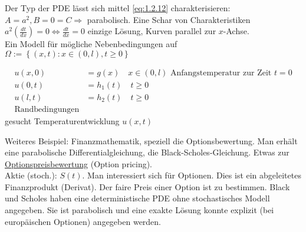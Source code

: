 Der Typ der PDE lässt sich mittel \eqref{eq:1.2.12} charakterisieren: $A=a^2, B=0=C \Rightarrow$ parabolisch. Eine Schar von Charakteristiken $a^2(\frac{dt}{dx})=0 \Leftrightarrow \frac{dt}{dx} = 0$ einzige Lösung, Kurven parallel zur $x$-Achse.\\

Ein Modell für mögliche Nebenbedingungen auf $\Omega:= \left\{ (x,t): x\in (0,l), t\geq 0 \right\}$

\begin{equation}
    \begin{aligned}
        u(x,0) &= g(x) \quad x\in (0,l) \text{ Anfangstemperatur zur Zeit } t=0\\
            u(0,t) &= h_1(t) \quad t\geq 0\\
            u(l,t) &= h_2(t) \quad t\geq 0\\
    \text{Randbedingungen}
\end{aligned}
    \label{}
\end{equation}
gesucht Temperaturentwicklung $u(x,t)$

Weiteres Beispiel: Finanzmathematik, speziell die Optionsbewertung. Man erhält eine parabolische Differentialgleichung, die Black-Scholes-Gleichung. Etwas zur \underline{Optionspreisbewertung} (Option pricing).\\
Aktie (stoch.): $S(t)$. Man interessiert sich für Optionen. Dies ist ein abgeleitetes Finanzprodukt (Derivat). Der faire Preis einer Option ist zu bestimmen. Black und Scholes haben eine deterministische PDE ohne stochastisches Modell angegeben. Sie ist parabolisch und eine exakte Lösung konnte explizit (bei europäischen Optionen) angegeben werden. 
